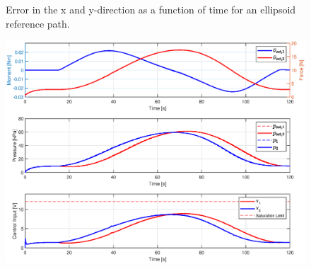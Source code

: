 \begin{figure}[H]
\begin{minipage}[b]{0.49\linewidth}
    \caption{Error in the x and y-direction as a function of time for an ellipsoid reference path.} 
    \label{app5:errorxyellipssim} 
    \end{minipage} 
\end{figure}

\begin{figure}[H]
    \centering
    \includegraphics[width = \textwidth]{Figures/Chapter5/inputellipssim.eps}
    \caption{}
    \label{app5:controlinputellipssim}
\end{figure}
